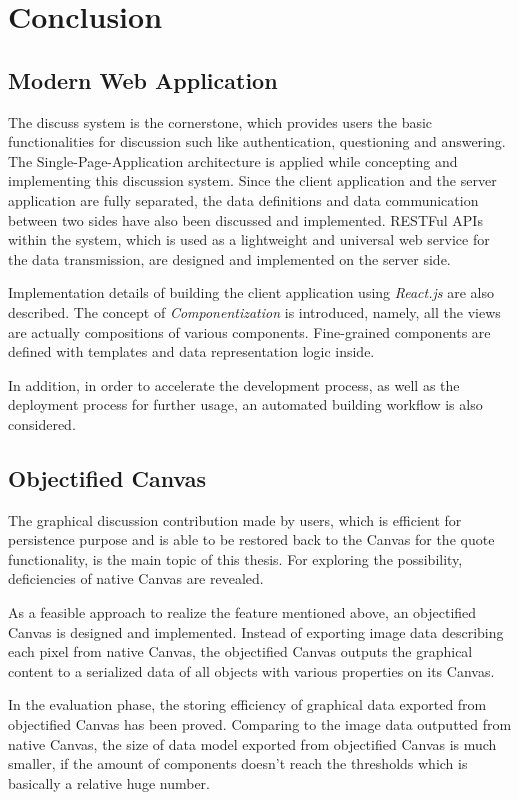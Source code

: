 \section{Conclusion}

\subsection{Modern Web Application}

The discuss system is the cornerstone, which provides users the basic functionalities for discussion such like authentication, questioning and answering. The Single-Page-Application architecture is applied while concepting and implementing this discussion system. Since the client application and the server application are fully separated, the data definitions and data communication between two sides have also been discussed and implemented. RESTFul APIs within the system, which is used as a lightweight and universal web service for the data transmission, are designed and implemented on the server side.

Implementation details of building the client application using \textit{React.js} are also described. The concept of \textit{Componentization} is introduced, namely, all the views are actually compositions of various components. Fine-grained components are defined with templates and data representation logic inside.

In addition, in order to accelerate the development process, as well as the deployment process for further usage, an automated building workflow is also considered. 


\subsection{Objectified Canvas}

The graphical discussion contribution made by users, which is efficient for persistence purpose and is able to be restored back to the Canvas for the quote functionality, is the main topic of this thesis. For exploring the possibility, deficiencies of native Canvas are revealed. 

As a feasible approach to realize the feature mentioned above, an objectified Canvas is designed and implemented. Instead of exporting image data describing each pixel from native Canvas, the objectified Canvas outputs the graphical content to a serialized data  of all objects with various properties on its Canvas. 

In the evaluation phase, the storing efficiency of graphical data exported from objectified Canvas has been proved. Comparing to the image data outputted from native Canvas, the size of data model exported from objectified Canvas is much smaller, if the amount of components doesn't reach the thresholds which is basically a relative huge number.

